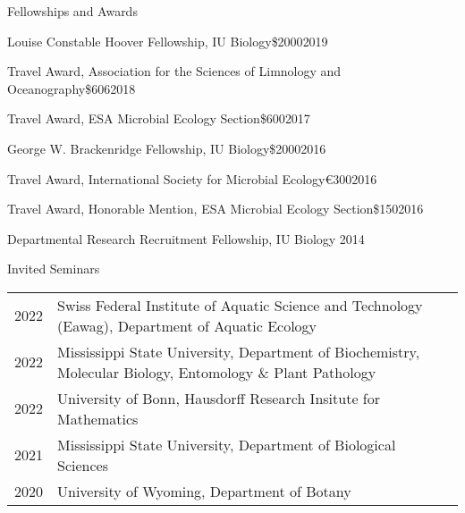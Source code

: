 \documentclass{resume} %
\begin{document}
\begin{rSection}{Fellowships and Awards}

\begin{Award}{Louise Constable Hoover Fellowship, IU Biology}{\$2000}{2019}
\end{Award}

\begin{Award}{Travel Award, Association for the Sciences of Limnology and Oceanography}{\$606}{2018}
\end{Award}

\begin{Award}{Travel Award, ESA Microbial Ecology Section}{\$600}{2017}
\end{Award}

\begin{Award}{George W. Brackenridge Fellowship, IU Biology}{\$2000}{2016}
\end{Award}

\begin{Award}{Travel Award, International Society for Microbial Ecology}{\euro{}300}{2016}
\end{Award}

\begin{Award}{Travel Award, Honorable Mention, ESA Microbial Ecology Section}{\$150}{2016}
\end{Award}

\begin{Award}{Departmental Research Recruitment Fellowship, IU Biology}{ }{2014}
\end{Award}

\end{rSection}

\bigskip
\begin{rSection}{Invited Seminars}
\begin{tabulary}{\textwidth}{lL}
2022 & Swiss Federal Institute of Aquatic Science and Technology (Eawag), Department of Aquatic Ecology\\

2022 & Mississippi State University, Department of Biochemistry, Molecular Biology, Entomology \& Plant Pathology\\

2022 & University of Bonn, Hausdorff Research Insitute for Mathematics\\

2021 & Mississippi State University, Department of Biological Sciences\\

2020 & University of Wyoming, Department of Botany\\
\end{tabulary}
\end{rSection}
\end{document}
